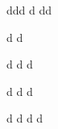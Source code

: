 \documentclass[20pt,twocolmn]{report}
\begin{document}
ddd
d
dd

d
d

d
d
d

d
d
d

d
d
d
d
\end{document}
